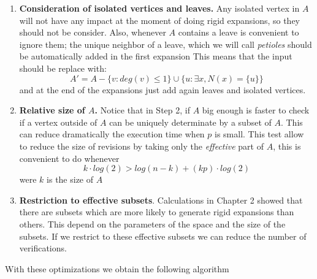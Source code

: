 \begin{enumerate}
\item \textbf{Consideration of isolated vertices and leaves.} Any isolated vertex in $A$ will not have any impact at the moment of doing rigid expansions, so they should not be consider. Also, whenever $A$ contains a leave is convenient to ignore them; the unique neighbor of a leave, which we will call \textit{petioles} should be automatically added in the first expansion
This means that the input should be replace with:
$$A' = A - \{v: deg(v)\leq 1 \} \cup \{u: \exists x, N(x)=\{u\}\} $$
and at the end of the expansions just add again leaves and isolated vertices.
\item \textbf{Relative size of $A$.} Notice that in Step 2, if $A$ big enough is faster to check if a vertex outside of $A$ can be uniquely determinate by a subset of $A$. 
This can reduce dramatically the execution time when $p$ is small. This test allow to reduce the size of revisions by taking only the \textit{effective} part of $A$, this is convenient to do whenever
$$k\cdot log(2) > log(n-k) + (kp)\cdot log(2)$$
were $k$ is the size of $A$
\item \textbf{Restriction to effective subsets}. Calculations in Chapter 2 showed that there are subsets which are more likely to generate rigid expansions than others. This depend on the parameters of the space and the size of the subsets. If we restrict to these effective subsets we can reduce the number of verifications.
\end{enumerate}

With these optimizations we obtain the following algorithm

